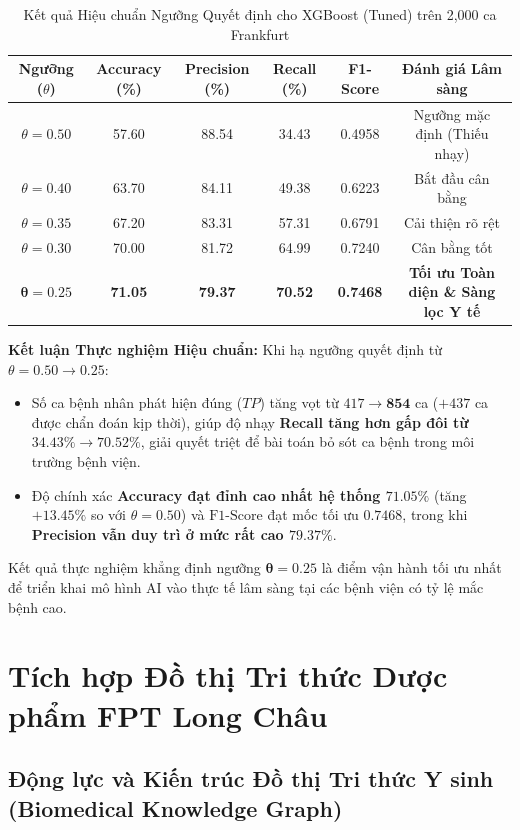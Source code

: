 \documentclass[12pt,a4paper]{report}
\begin{document}
\begin{table}[H]
\centering
\small
\begin{tabular}{cccccc}
\toprule
\textbf{Ngưỡng ($\theta$)} & \textbf{Accuracy (\%)} & \textbf{Precision (\%)} & \textbf{Recall (\%)} & \textbf{F1-Score} & \textbf{Đánh giá Lâm sàng} \\
\midrule
$\theta = 0.50$ & 57.60 & 88.54 & 34.43 & 0.4958 & Ngưỡng mặc định (Thiếu nhạy) \\
$\theta = 0.40$ & 63.70 & 84.11 & 49.38 & 0.6223 & Bắt đầu cân bằng \\
$\theta = 0.35$ & 67.20 & 83.31 & 57.31 & 0.6791 & Cải thiện rõ rệt \\
$\theta = 0.30$ & 70.00 & 81.72 & 64.99 & 0.7240 & Cân bằng tốt \\
$\mathbf{\theta = 0.25}$ & \textbf{71.05} & \textbf{79.37} & \textbf{70.52} & \textbf{0.7468} & \textbf{Tối ưu Toàn diện \& Sàng lọc Y tế} \\
\bottomrule
\end{tabular}
\caption{Kết quả Hiệu chuẩn Ngưỡng Quyết định cho XGBoost (Tuned) trên 2,000 ca Frankfurt}
\label{tab:threshold_tuning}
\end{table}

\textbf{Kết luận Thực nghiệm Hiệu chuẩn:} Khi hạ ngưỡng quyết định từ $\theta = 0.50 \to \mathbf{0.25}$:
\begin{itemize}[leftmargin=1.5em]
    \item Số ca bệnh nhân phát hiện đúng ($TP$) tăng vọt từ $417 \to \mathbf{854}$ ca ($+437$ ca được chẩn đoán kịp thời), giúp độ nhạy \textbf{Recall tăng hơn gấp đôi từ $34.43\% \to \mathbf{70.52\%}$}, giải quyết triệt để bài toán bỏ sót ca bệnh trong môi trường bệnh viện.
    \item Độ chính xác \textbf{Accuracy đạt đỉnh cao nhất hệ thống $\mathbf{71.05\%}$} (tăng $+13.45\%$ so với $\theta=0.50$) và $\text{F1-Score}$ đạt mốc tối ưu $\mathbf{0.7468}$, trong khi \textbf{Precision vẫn duy trì ở mức rất cao $79.37\%$}.
\end{itemize}
Kết quả thực nghiệm khẳng định ngưỡng $\mathbf{\theta = 0.25}$ là điểm vận hành tối ưu nhất để triển khai mô hình AI vào thực tế lâm sàng tại các bệnh viện có tỷ lệ mắc bệnh cao.

\section{Tích hợp Đồ thị Tri thức Dược phẩm FPT Long Châu}

\subsection{Động lực và Kiến trúc Đồ thị Tri thức Y sinh (Biomedical Knowledge Graph)}
\end{document}
